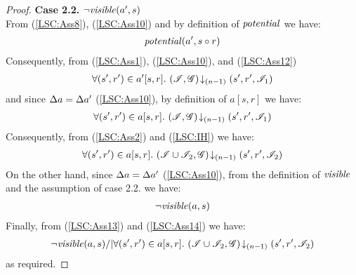\begin{lemma}
\begin{proof}
\noindent\textbf{Case 2.2.} $\neg\mathit{visible}(a', s)$ \\
From (\ref{LSC:Ass8}), (\ref{LSC:Ass10}) and by definition of $\mathit{potential}$ we have:
%
\begin{align}
	\mathit{potential}(a', s \circ r) \label{LSC:Ass12}
\end{align}
%
Consequently, from (\ref{LSC:Ass1}), (\ref{LSC:Ass10}), and (\ref{LSC:Ass12}) 
%
\begin{align*}
	\forall (s', r') \in a'[s, r].\, \left(\mathscr{I}, \mathscr{G}\right) \!\downarrow_{(n-1)} \left(s', r', \mathscr{I}_1\right)
\end{align*}
% 
and since $\Delta {a} = \Delta {a'}$ (\ref{LSC:Ass10}), by definition of $a[s, r]$ we have:
%
\begin{align*}
	\forall (s', r') \in a[s, r].\, \left(\mathscr{I}, \mathscr{G}\right) \!\downarrow_{(n-1)} \left(s', r', \mathscr{I}_1\right) 
\end{align*}
%
Consequently, from (\ref{LSC:Ass2}) and (\ref{LSC:IH}) we have: 
%
\begin{align}
	\forall (s', r') \in a[s, r].\, \left(\mathscr{I} \cup \mathscr{I}_2, \mathscr{G}\right) \!\downarrow_{(n-1)} \left(s', r', \mathscr{I}_2\right) \label{LSC:Ass13}
\end{align}
%
On the other hand, since $\Delta {a} = \Delta {a'}$ (\ref{LSC:Ass10}), from the definition of $\mathit{visible}$ and the assumption of case 2.2. we have:
%
\begin{align}
	\neg\mathit{visible}(a, s) \label{LSC:Ass14}
\end{align}
Finally, from (\ref{LSC:Ass13}) and (\ref{LSC:Ass14}) we have:
%
\begin{align*}
	\neg\mathit{visible}(a, s) /| \forall (s', r') \in a[s, r].\, \left(\mathscr{I} \cup \mathscr{I}_2, \mathscr{G}\right) \!\downarrow_{(n-1)} \left(s', r', \mathscr{I}_2\right) 
\end{align*}
%
as required.

\end{proof}
\end{lemma}
%
%
%
%
%
%
